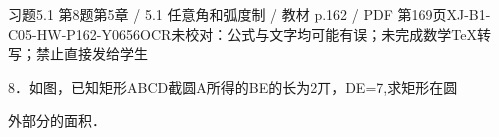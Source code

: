 \begin{bankitem}{习题5.1 第8题}{第5章 / 5.1 任意角和弧度制 / 教材 p.162 / PDF 第169页}{XJ-B1-C05-HW-P162-Y0656}{OCR未校对：公式与文字均可能有误；未完成数学TeX转写；禁止直接发给学生}
\begin{ocrdraft}
\par
8．如图，已知矩形ABCD截圆A所得的BE的长为2丌，DE=7,求矩形在圆
\par
外部分的面积．
\end{ocrdraft}
\end{bankitem}
